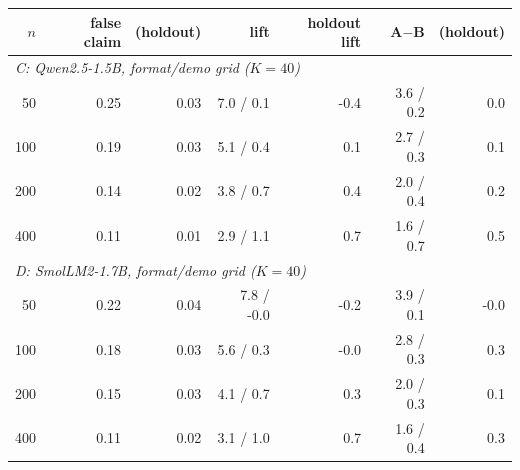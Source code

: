 \begin{tabular}{rrrrrrr}\toprule
$n$ & false claim & (holdout) & lift & holdout lift & A$-$B & (holdout) \\\midrule
\multicolumn{7}{l}{\emph{C: Qwen2.5-1.5B, format/demo grid ($K{=}40$)}} \\
50 & 0.25 & 0.03 & 7.0 / 0.1 & -0.4 & 3.6 / 0.2 & 0.0 \\
100 & 0.19 & 0.03 & 5.1 / 0.4 & 0.1 & 2.7 / 0.3 & 0.1 \\
200 & 0.14 & 0.02 & 3.8 / 0.7 & 0.4 & 2.0 / 0.4 & 0.2 \\
400 & 0.11 & 0.01 & 2.9 / 1.1 & 0.7 & 1.6 / 0.7 & 0.5 \\
\multicolumn{7}{l}{\emph{D: SmolLM2-1.7B, format/demo grid ($K{=}40$)}} \\
50 & 0.22 & 0.04 & 7.8 / -0.0 & -0.2 & 3.9 / 0.1 & -0.0 \\
100 & 0.18 & 0.03 & 5.6 / 0.3 & -0.0 & 2.8 / 0.3 & 0.3 \\
200 & 0.15 & 0.03 & 4.1 / 0.7 & 0.3 & 2.0 / 0.3 & 0.1 \\
400 & 0.11 & 0.02 & 3.1 / 1.0 & 0.7 & 1.6 / 0.4 & 0.3 \\
\bottomrule
\end{tabular}
